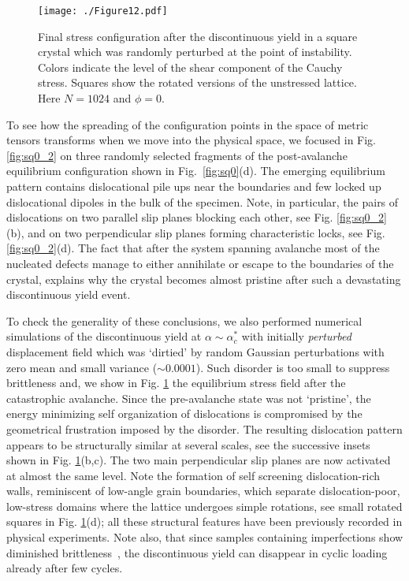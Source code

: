 \documentclass[CRPHYS,Unicode,manuscript]{cedram}
\begin{document}
\begin{figure}[h!]
\centering
\texttt{[image: ./Figure12.pdf]}
\caption{\scriptsize {Final stress configuration after the  discontinuous yield in a square crystal  which was  randomly perturbed at the point of instability. Colors indicate the level of the  shear component of the Cauchy stress. 
Squares show   the rotated versions of the unstressed  lattice. Here $N=1024$ and $\phi=0$.}
 \label{fig:disorder}}
\end{figure}


To see how the spreading of the configuration points in the space of metric tensors transforms when we move into   the physical space, we focused  in   Fig. \ref{fig:sq0_2} on three  randomly selected  fragments of  the post-avalanche  equilibrium configuration shown in Fig.~\ref{fig:sq0}(d). The emerging equilibrium pattern contains dislocational pile ups near the boundaries and few locked up dislocational dipoles   in the bulk of the specimen. Note, in particular, the   pairs of dislocations on two parallel slip planes blocking each other, see  Fig. \ref{fig:sq0_2}(b), and on two perpendicular slip planes forming   characteristic locks, see  Fig. \ref{fig:sq0_2}(d). The fact   that after the system spanning avalanche most of the nucleated defects manage to either annihilate  or  escape  to the boundaries of the crystal, explains why the crystal  becomes almost pristine  after such a devastating  discontinuous yield event.

To check the generality of these conclusions, we  also performed   numerical simulations of the discontinuous yield  at $\alpha \sim \alpha^*_c$ with  initially \emph{perturbed} displacement field which was `dirtied'  by  random Gaussian  perturbations  with  zero mean and small variance ($ \sim 0.0001$). Such disorder is too small  to suppress brittleness \cite{Zhang2020-ax} and, we show in Fig. \ref{fig:disorder} the  equilibrium stress field after the catastrophic avalanche. Since the pre-avalanche state was not `pristine', the energy minimizing self organization of dislocations is compromised by the geometrical frustration  imposed by the disorder. The  resulting dislocation  pattern appears to be structurally similar at several scales, see the successive insets shown in  Fig. \ref{fig:disorder}(b,c). The two main perpendicular slip planes are now activated at almost the same level.  Note  the formation of self screening dislocation-rich walls, reminiscent of low-angle grain boundaries,  which separate   dislocation-poor, low-stress  domains  where  the lattice  undergoes simple rotations, see small rotated squares in Fig. \ref{fig:disorder}(d);  all these structural features have been previously recorded in  physical experiments. Note also, that since  samples containing imperfections   show diminished brittleness~\cite{Zhang2020-ax}, the  discontinuous yield can disappear   in cyclic loading already after few cycles.  
\end{document}

